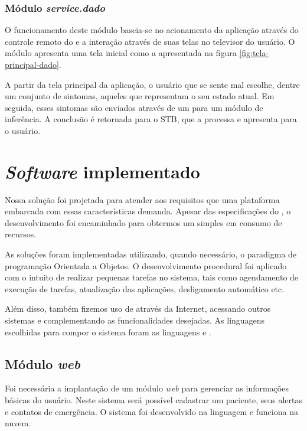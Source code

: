 \subsubsection{Módulo \textit{service.dado}}\label{subsubsec:dado}

O funcionamento deste módulo baseia-se no acionamento da aplicação através
do controle remoto do \stb[] e a interação através de suas telas no televisor
do usuário. O módulo apresenta uma tela inicial como a apresentada na 
figura \ref{fig:tela-principal-dado}.

A partir da tela principal da aplicação, o usuário que se sente mal escolhe, 
dentre um conjunto de sintomas, aqueles que representam o seu estado atual. Em
seguida, esses sintomas são enviados através de um \webservice[] para um
módulo de inferência. A conclusão é retornada para o STB, que a processa e 
apresenta para o usuário.

\section{\textit{Software} implementado}\label{sec:software-implementado}

Nossa solução foi projetada para atender aos requisitos que uma plataforma
embarcada com essas características demanda. Apesar das especificações do
\hardware[], o desenvolvimento foi encaminhado para obtermos um \software[]
simples em consumo de recursos.

As soluções foram implementadas utilizando, quando necessário, o paradigma
de programação Orientada a Objetos. O desenvolvimento procedural foi aplicado
com o intuito de realizar pequenas tarefas no sistema, tais como agendamento
de execução de tarefas, atualização das aplicações, desligamento automático etc.

Além disso, também fizemos uso de \webservices[] através da Internet, acessando
outros sistemas e complementando as funcionalidades desejadas. As linguagens
escolhidas para compor o sistema foram as linguagens \python[] e \shell.

\subsection{Módulo \textit{web}}

Foi necessária a implantação de um módulo \textit{web} para gerenciar as 
informações básicas do usuário. Neste sistema será possível cadastrar um 
paciente, seus alertas e contatos de emergência. O sistema foi desenvolvido
na linguagem \python[] e funciona na nuvem.

